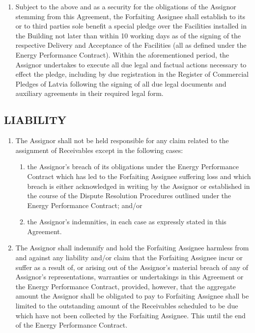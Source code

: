 \documentclass[a4paper]{article}
\begin{document}
\begin{multicols}{2}
\begin{enumerate}
  \item{Subject to the above and as a security for the obligations of
      the Assignor stemming from this Agreement, the Forfaiting
      Assignee shall establish to its or to third parties sole benefit
      a special pledge over the Facilities installed in the Building
      not later than within 10 working days as of the signing of the
      respective Delivery and Acceptance of the Facilities (all as
      defined under the Energy Performance Contract). Within the
      aforementioned period, the Assignor undertakes to execute all
      due legal and factual actions necessary to effect the pledge,
      including by due registration in the Register of Commercial
      Pledges of Latvia following the signing of all due legal
      documents and auxiliary agreements in their required legal
      form.}
  \end{enumerate}

  \subsection{LIABILITY}

  \begin{enumerate}
  \item{The Assignor shall not be held responsible for any claim
      related to the assignment of Receivables except in the following
      cases: }
    \begin{enumerate}
    \item{the Assignor’s breach of its obligations under the Energy
        Performance Contract which has led to the Forfaiting Assignee
        suffering loss and which breach is either acknowledged in
        writing by the Assignor or established in the course of the
        Dispute Resolution Procedures outlined under the Energy
        Performance Contract; and/or}

    \item{the Assignor’s indemnities, in each case as expressly
        stated in this Agreement.}
    \end{enumerate}

  \item{The Assignor shall indemnify and hold the Forfaiting Assignee
      harmless from and against any liability and/or claim that the
      Forfaiting Assignee incur or suffer as a result of, or arising
      out of the Assignor’s material breach of any of Assignor’s
      representations, warranties or undertakings in this Agreement or
      the Energy Performance Contract, provided, however, that the
      aggregate amount the Assignor shall be obligated to pay to
      Forfaiting Assignee shall be limited to the outstanding amount
      of the Receivables scheduled to be due which have not been
      collected by the Forfaiting Assignee. This until the end of the
      Energy Performance Contract.}


\end{enumerate}
\end{multicols}
\end{document}
